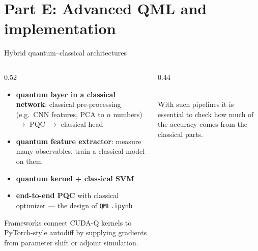 \documentclass[aspectratio=169,11pt]{beamer}
\newcommand{\key}[1]{{\color{qdark}\textbf{#1}}}
\begin{document}
\section{Part E: Advanced QML and implementation}
\begin{frame}[label=fHArch]{Hybrid quantum--classical architectures}
  \begin{columns}[T]
    \begin{column}{0.52\textwidth}
      \small
      \begin{itemize}\itemsep2pt
        \item \key{quantum layer in a classical network}: classical pre-processing (e.g.\ CNN features, PCA to $n$ numbers) $\to$ PQC $\to$ classical head
        \item \key{quantum feature extractor}: measure many observables, train a classical model on them
        \item \key{quantum kernel + classical SVM}
        \item \key{end-to-end PQC} with classical optimizer --- the design of \texttt{QML.ipynb}
      \end{itemize}
      \scriptsize Frameworks connect CUDA-Q kernels to PyTorch-style autodiff by supplying gradients from parameter shift or adjoint simulation.
    \end{column}
    \begin{column}{0.44\textwidth}
      \centering
      \\
      \scriptsize With such pipelines it is essential to check how much of the accuracy comes from the classical parts.
    \end{column}
  \end{columns}
\end{frame}
\end{document}
